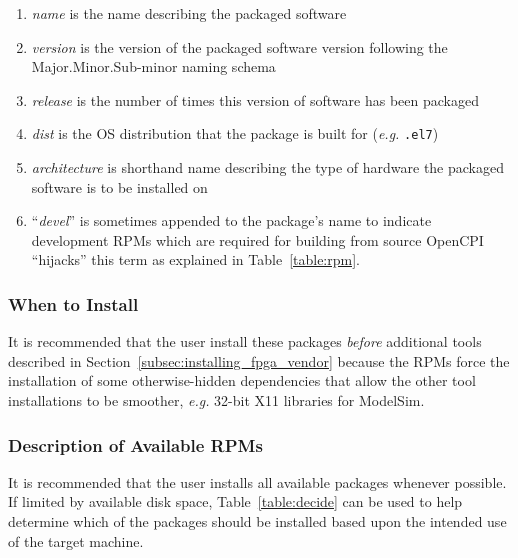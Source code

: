 \begin{enumerate}
    \item \textit{name} is the name describing the packaged software
    \item \textit{version} is the version of the packaged software
    \subitem version following the Major.Minor.Sub-minor naming schema
    \item \textit{release} is the number of times this version of software has been packaged
    \item \textit{dist} is the OS distribution that the package is built for (\textit{e.g.} \texttt{.el7})
    \item \textit{architecture} is shorthand name describing the type of hardware the packaged software is to be installed on
    \item ``\textit{devel}'' is sometimes appended to the package's name to indicate development RPMs which are required for building from source
    \subitem OpenCPI ``hijacks'' this term as explained in Table~\ref{table:rpm}.
\end{enumerate}

\subsubsection*{When to Install}
It is recommended that the user install these packages \textit{before} additional tools described in Section~\ref{subsec:installing_fpga_vendor} because the RPMs force the installation of some otherwise-hidden dependencies that allow the other tool installations to be smoother, \textit{e.g.} 32-bit X11 libraries for ModelSim.

\subsubsection{Description of Available RPMs}
\label{sec:install_av_rpm}
It is recommended that the user installs all available packages whenever possible. If limited by available disk space, Table~\ref{table:decide} can be used to help determine which of the packages should be installed based upon the intended use of the target machine.\\

